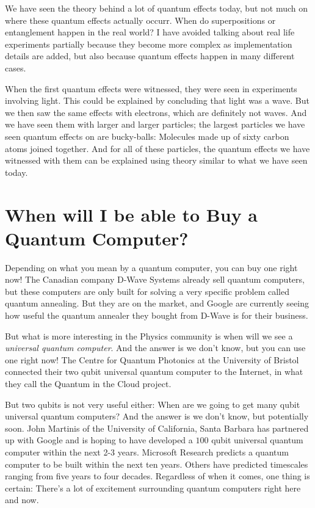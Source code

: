 \documentclass[twocolumn]{article}
\begin{document}
We have seen the theory behind a lot of quantum effects today, but not much on where these quantum effects actually occurr. When do superpositions or entanglement happen in the real world? I have avoided talking about real life experiments partially because they become more complex as implementation details are added, but also because quantum effects happen in many different cases.

When the first quantum effects were witnessed, they were seen in experiments involving light. This could be explained by concluding that light was a wave. But we then saw the same effects with electrons, which are definitely not waves. And we have seen them with larger and larger particles; the largest particles we have seen quantum effects on are bucky-balls: Molecules made up of sixty carbon atoms joined together. And for all of these particles, the quantum effects we have witnessed with them can be explained using theory similar to what we have seen today.

\section{When will I be able to Buy a Quantum Computer?}

Depending on what you mean by a quantum computer, you can buy one right now! The Canadian company D-Wave Systems already sell quantum computers, but these computers are only built for solving a very specific problem called quantum annealing. But they are on the market, and Google are currently seeing how useful the quantum annealer they bought from D-Wave is for their business.

But what is more interesting in the Physics community is when will we see a {\em universal quantum computer}. And the answer is we don't know, but you can use one right now! The Centre for Quantum Photonics at the University of Bristol connected their two qubit universal quantum computer to the Internet, in what they call the Quantum in the Cloud project.

But two qubits is not very useful either: When are we going to get many qubit universal quantum computers? And the answer is we don't know, but potentially soon. John Martinis of the University of California, Santa Barbara has partnered up with Google and is hoping to have developed a $100$ qubit universal quantum computer within the next 2-3 years. Microsoft Research predicts a quantum computer to be built within the next ten years. Others have predicted timescales ranging from five years to four decades. Regardless of when it comes, one thing is certain: There's a lot of excitement surrounding quantum computers right here and now.
\end{document}
